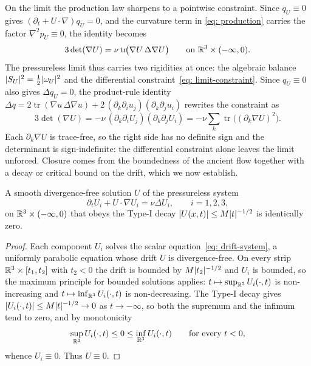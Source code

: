 On the limit the production law sharpens to a pointwise constraint. Since
$q_U\equiv0$ gives $(\partial_t + U\cdot\nabla)q_U = 0$, and the curvature term in
\eqref{eq: production} carries the factor $\nabla^2 p_U\equiv0$, the identity
becomes
\begin{equation}\label{eq: limit-constraint}
  3\det(\nabla U) = \nu\operatorname{tr}\!\bigl(\nabla U\,\Delta\nabla U\bigr)
  \qquad\text{on } \mathbb{R}^3\times(-\infty,0).
\end{equation}
The pressureless limit thus carries two rigidities at once: the algebraic balance
$\lvert S_U \rvert^2 = \tfrac12\lvert \omega_U \rvert^2$ and the differential
constraint~\eqref{eq: limit-constraint}. Since $q_U\equiv0$ also gives
$\Delta q_U = 0$, the product-rule identity
$\Delta q = 2\operatorname{tr}(\nabla u\,\Delta\nabla u)
+ 2\,(\partial_k\partial_i u_j)(\partial_k\partial_j u_i)$ rewrites the
constraint as
\begin{equation}\label{eq: constraint-hessian}
  3\det(\nabla U)
  = -\nu\,(\partial_k\partial_i U_j)(\partial_k\partial_j U_i)
  = -\nu\sum_{k}\operatorname{tr}\!\bigl((\partial_k\nabla U)^2\bigr).
\end{equation}
Each $\partial_k\nabla U$ is trace-free, so the right side has no definite sign and
the determinant is sign-indefinite: the differential constraint alone leaves the
limit unforced. Closure comes from the boundedness of the ancient flow together with
a decay or critical bound on the drift, which we now establish.

\begin{lemma}\label{lem: liouville}
A smooth divergence-free solution $U$ of the pressureless system
\begin{equation}\label{eq: drift-system}
  \partial_t U_i + U\cdot\nabla U_i = \nu\Delta U_i, \qquad i = 1,2,3,
\end{equation}
on $\mathbb{R}^3\times(-\infty,0)$ that obeys the Type-I decay
$\lvert U(x,t) \rvert \le M\lvert t \rvert^{-1/2}$ is identically zero.
\end{lemma}

\begin{proof}
Each component $U_i$ solves the scalar equation~\eqref{eq: drift-system}, a
uniformly parabolic equation whose drift $U$ is divergence-free. On every strip
$\mathbb{R}^3\times[t_1,t_2]$ with $t_2 < 0$ the drift is bounded by $M\lvert t_2 \rvert^{-1/2}$
and $U_i$ is bounded, so the maximum principle for bounded solutions applies:
$t \mapsto \sup_{\mathbb{R}^3} U_i(\cdot,t)$ is non-increasing and
$t \mapsto \inf_{\mathbb{R}^3} U_i(\cdot,t)$ is non-decreasing. The Type-I decay gives
$\lvert U_i(\cdot,t) \rvert \le M\lvert t \rvert^{-1/2} \to 0$ as $t\to-\infty$, so both the
supremum and the infimum tend to zero, and by monotonicity
\[
  \sup_{\mathbb{R}^3} U_i(\cdot,t) \le 0 \le \inf_{\mathbb{R}^3} U_i(\cdot,t)
  \qquad\text{for every } t < 0,
\]
whence $U_i\equiv0$. Thus $U\equiv0$.
\end{proof}

